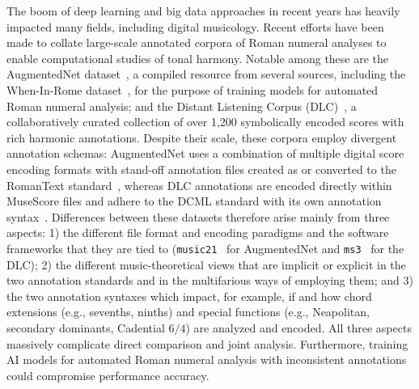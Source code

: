 \documentclass[sigconf]{acmart} %
\begin{document}
The boom of deep learning and big data approaches in recent years has heavily impacted many fields, including digital musicology. Recent efforts have been made to collate large-scale annotated corpora of Roman numeral analyses to enable computational studies of tonal harmony. Notable among these are the AugmentedNet dataset~\cite{NapolesLopez2021_AugmentedNetRomanNumeral}, a compiled resource from several sources, including the When-In-Rome dataset~\cite{Gotham2023_WhenRomeMetacorpus}, for the purpose of training models for automated Roman numeral analysis; and the Distant Listening Corpus (DLC)~\cite{Hentschel2025_CorpusModularInfrastructure}, a collaboratively curated collection of over 1,200 symbolically encoded scores with rich harmonic annotations. Despite their scale, these corpora employ divergent annotation schemas: AugmentedNet uses a combination of multiple digital score encoding formats with stand-off annotation files created as or converted to the RomanText standard~\cite{Tymoczko2019_RomanTextFormatFlexible}, whereas DLC annotations are encoded directly within MuseScore files and adhere to the DCML standard with its own annotation syntax~\cite{Neuwirth2018_AnnotatedBeethovenCorpus,Hentschel2021_AnnotatedMozartSonatasa,Hentschel2024_AnnotatedCorpusTonal}.
%
Differences between these datasets therefore arise mainly from three aspects: 1) the different file format and encoding paradigms and the software frameworks that they are tied to (\texttt{music21}~\cite{Cuthbert2010_Music21ToolkitComputeraided} for AugmentedNet and \texttt{ms3}~\cite{Hentschel2023_Ms3ParserMuseScore} for the DLC); 2) the different music-theoretical views that are implicit or explicit in the two annotation standards and in the multifarious ways of employing them; and 3) the two annotation syntaxes which impact, for example, if and how chord extensions (e.g., sevenths, ninths) and special functions (e.g., Neapolitan, secondary dominants, Cadential $6/4$) are analyzed and encoded. All three aspects massively complicate direct comparison and joint analysis. 
Furthermore, training AI models for automated Roman numeral analysis with inconsistent annotations could compromise performance accuracy.
\end{document}
